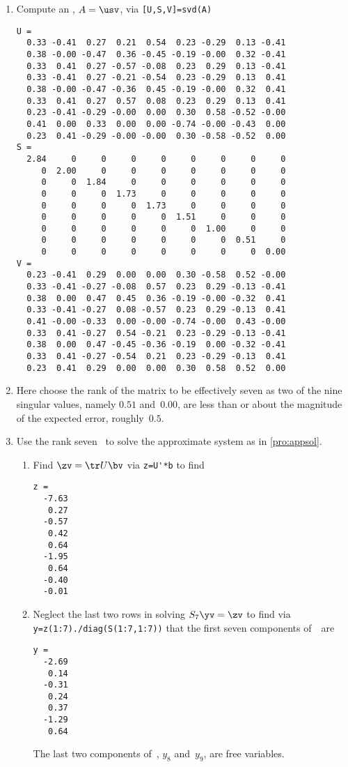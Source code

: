 \begin{example}
\begin{solution}
\begin{enumerate}
\item Compute an \svd, \(A=\usv\), via \verb|[U,S,V]=svd(A)| \twodp
{\small
\begin{verbatim}
U =
  0.33 -0.41  0.27  0.21  0.54  0.23 -0.29  0.13 -0.41
  0.38 -0.00 -0.47  0.36 -0.45 -0.19 -0.00  0.32 -0.41
  0.33  0.41  0.27 -0.57 -0.08  0.23  0.29  0.13 -0.41
  0.33 -0.41  0.27 -0.21 -0.54  0.23 -0.29  0.13  0.41
  0.38 -0.00 -0.47 -0.36  0.45 -0.19 -0.00  0.32  0.41
  0.33  0.41  0.27  0.57  0.08  0.23  0.29  0.13  0.41
  0.23 -0.41 -0.29 -0.00  0.00  0.30  0.58 -0.52 -0.00
  0.41  0.00  0.33  0.00  0.00 -0.74 -0.00 -0.43  0.00
  0.23  0.41 -0.29 -0.00 -0.00  0.30 -0.58 -0.52  0.00
S =
  2.84     0     0     0     0     0     0     0     0
     0  2.00     0     0     0     0     0     0     0
     0     0  1.84     0     0     0     0     0     0
     0     0     0  1.73     0     0     0     0     0
     0     0     0     0  1.73     0     0     0     0
     0     0     0     0     0  1.51     0     0     0
     0     0     0     0     0     0  1.00     0     0
     0     0     0     0     0     0     0  0.51     0
     0     0     0     0     0     0     0     0  0.00
V =
  0.23 -0.41  0.29  0.00  0.00  0.30 -0.58  0.52 -0.00
  0.33 -0.41 -0.27 -0.08  0.57  0.23  0.29 -0.13 -0.41
  0.38  0.00  0.47  0.45  0.36 -0.19 -0.00 -0.32  0.41
  0.33 -0.41 -0.27  0.08 -0.57  0.23  0.29 -0.13  0.41
  0.41 -0.00 -0.33  0.00 -0.00 -0.74 -0.00  0.43 -0.00
  0.33  0.41 -0.27  0.54 -0.21  0.23 -0.29 -0.13 -0.41
  0.38  0.00  0.47 -0.45 -0.36 -0.19  0.00 -0.32 -0.41
  0.33  0.41 -0.27 -0.54  0.21  0.23 -0.29 -0.13  0.41
  0.23  0.41  0.29  0.00  0.00  0.30  0.58  0.52  0.00
\end{verbatim}
}%

\item Here choose the rank of the matrix to be effectively seven as two of the nine singular values, namely \(0.51\) and~\(0.00\), are less than or about the magnitude of the expected error, roughly~\(0.5\).

\item Use the rank seven \svd\ to solve the approximate system as in \cref{pro:appsol}.
\begin{enumerate}
\item Find \(\zv=\tr U\bv\) via \verb|z=U'*b| to find
\begin{verbatim}
z =
  -7.63
   0.27
  -0.57
   0.42
   0.64
  -1.95
   0.64
  -0.40
  -0.01
\end{verbatim}

\item Neglect the last two rows in solving \(S_7\yv=\zv\) to find via
\verb|y=z(1:7)./diag(S(1:7,1:7))| that the first seven components of~\yv\ are
\begin{verbatim}
y =
  -2.69
   0.14
  -0.31
   0.24
   0.37
  -1.29
   0.64
\end{verbatim}
The last two components of~\yv, \(y_8\) and~\(y_9\), are free variables.


\end{enumerate}
\end{enumerate}
\end{solution}
\end{example}
